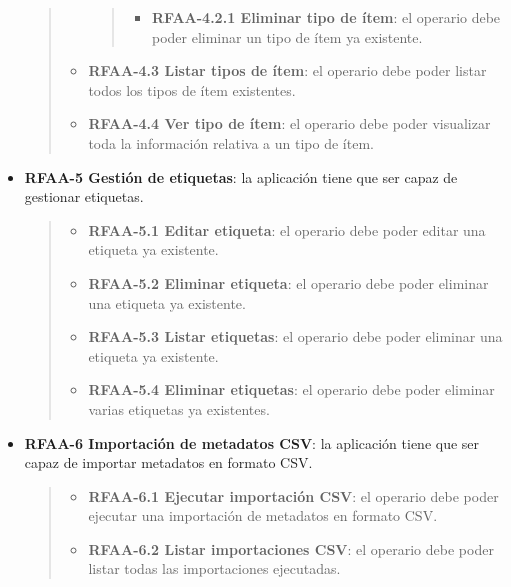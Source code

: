 \begin{itemize}
\begin{quote}
\begin{itemize}
    \begin{quote}
    \begin{itemize}
    \tightlist
    \item
      \textbf{RFAA-4.2.1 Eliminar tipo de ítem}: el operario debe poder
      eliminar un tipo de ítem ya existente.
    \end{itemize}
    \end{quote}
  \item
    \textbf{RFAA-4.3 Listar tipos de ítem}: el operario debe poder
    listar todos los tipos de ítem existentes.
  \item
    \textbf{RFAA-4.4 Ver tipo de ítem}: el operario debe poder
    visualizar toda la información relativa a un tipo de ítem.
  \end{itemize}
  \end{quote}
\item
  \textbf{RFAA-5 Gestión de etiquetas}: la aplicación tiene que ser
  capaz de gestionar etiquetas.

  \begin{quote}
  \begin{itemize}
  \tightlist
  \item
    \textbf{RFAA-5.1 Editar etiqueta}: el operario debe poder editar una
    etiqueta ya existente.
  \item
    \textbf{RFAA-5.2 Eliminar etiqueta}: el operario debe poder eliminar
    una etiqueta ya existente.
  \item
    \textbf{RFAA-5.3 Listar etiquetas}: el operario debe poder eliminar
    una etiqueta ya existente.
  \item
    \textbf{RFAA-5.4 Eliminar etiquetas}: el operario debe poder
    eliminar varias etiquetas ya existentes.
  \end{itemize}
  \end{quote}
\item
  \textbf{RFAA-6 Importación de metadatos CSV}: la aplicación tiene que
  ser capaz de importar metadatos en formato CSV.

  \begin{quote}
  \begin{itemize}
  \item
    \textbf{RFAA-6.1 Ejecutar importación CSV}: el operario debe poder
    ejecutar una importación de metadatos en formato CSV.
  \item
    \textbf{RFAA-6.2 Listar importaciones CSV}: el operario debe poder
    listar todas las importaciones ejecutadas.


\end{itemize}
\end{quote}
\end{itemize}
